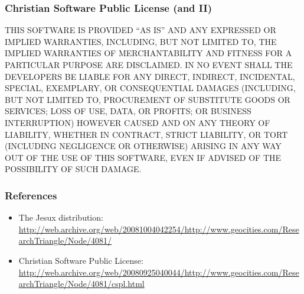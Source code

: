 \documentclass{beamer}
\begin{document}

\begin{frame}
\frametitle{Christian Software Public License (and II)}

\small

THIS SOFTWARE IS PROVIDED ``AS IS'' AND ANY EXPRESSED OR
IMPLIED WARRANTIES, INCLUDING, BUT NOT LIMITED TO, THE
IMPLIED WARRANTIES OF MERCHANTABILITY AND FITNESS FOR A
PARTICULAR PURPOSE ARE DISCLAIMED. IN NO EVENT SHALL THE
DEVELOPERS BE LIABLE FOR ANY DIRECT, INDIRECT, INCIDENTAL,
SPECIAL, EXEMPLARY, OR CONSEQUENTIAL DAMAGES (INCLUDING,
BUT NOT LIMITED TO, PROCUREMENT OF SUBSTITUTE GOODS OR
SERVICES; LOSS OF USE, DATA, OR PROFITS; OR BUSINESS
INTERRUPTION) HOWEVER CAUSED AND ON ANY THEORY OF
LIABILITY, WHETHER IN CONTRACT, STRICT LIABILITY, OR TORT
(INCLUDING NEGLIGENCE OR OTHERWISE) ARISING IN ANY WAY OUT
OF THE USE OF THIS SOFTWARE, EVEN IF ADVISED OF THE
POSSIBILITY OF SUCH DAMAGE.


\end{frame}



\begin{frame}
\frametitle{References}

\begin{itemize}
\item The Jesux distribution: \\
{\tiny \href{http://web.archive.org/web/20081004042254/http://www.geocities.com/ResearchTriangle/Node/4081/}{http://web.archive.org/web/20081004042254/http://www.geocities.com/ResearchTriangle/Node/4081/}}
\item Christian Software Public License: \\
{\tiny \href{http://web.archive.org/web/20080925040044/http://www.geocities.com/ResearchTriangle/Node/4081/cspl.html}{http://web.archive.org/web/20080925040044/http://www.geocities.com/ResearchTriangle/Node/4081/cspl.html}}
\end{itemize}

\end{frame}


\end{document}
